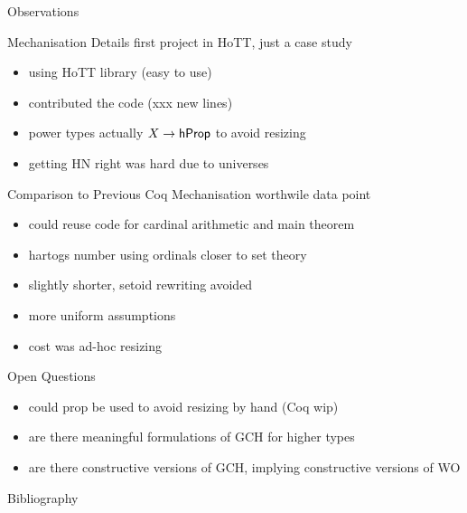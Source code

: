 \documentclass[xcolor=dvipsnames,compress,aspectratio=169,handout]{beamer}
\begin{document}
\begin{frame}
	\Huge
	\centering
	Observations
\end{frame}

\begin{frame}{Mechanisation Details}
	first project in HoTT, just a case study
	\begin{itemize}
		\item
		using HoTT library (easy to use)
		\item
		contributed the code (xxx new lines)
		\item
		power types actually $X\to\mathsf{hProp}$ to avoid resizing
		\item
		getting HN right was hard due to universes
	\end{itemize}
\end{frame}

\begin{frame}{Comparison to Previous Coq Mechanisation}
	worthwile data point
	\begin{itemize}
		\item
		could reuse code for cardinal arithmetic and main theorem
		\item
		hartogs number using ordinals closer to set theory
		\item
		slightly shorter, setoid rewriting avoided
		\item
		more uniform assumptions
		\item
		cost was ad-hoc resizing
	\end{itemize}
\end{frame}

\begin{frame}{Open Questions}
	\begin{itemize}
		\item
		could prop be used to avoid resizing by hand (Coq wip)
		\item
		are there meaningful formulations of GCH for higher types
		\item
		are there constructive versions of GCH, implying constructive versions of WO
	\end{itemize}
\end{frame}



\begin{frame}{Bibliography}
\small


\end{frame}
\end{document}
